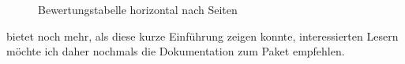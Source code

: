 \begin{figure}
\caption{Bewertungstabelle horizontal nach Seiten}\label{fig:ver}
\end{figure} 


 bietet noch mehr, als diese kurze Einführung zeigen konnte, interessierten Lesern möchte ich daher nochmals die Dokumentation zum Paket empfehlen. 
